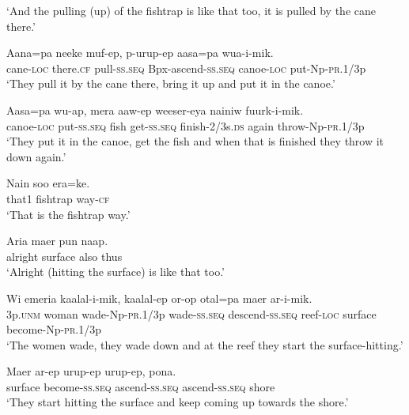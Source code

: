 \glt ‘And the pulling (up) of the fishtrap is like that too, it is pulled by the cane there.’ \\
\z


\ea
\gll  Aana=pa  neeke  muf-ep,  p-urup-ep  aasa=pa  wua-i-mik. \\
cane-\textsc{loc}  there.\textsc{cf}  pull-\textsc{ss.seq}  Bpx-ascend-\textsc{ss.seq}     canoe-\textsc{loc}  put-Np-\textsc{pr}.1/3p \\


\glt ‘They pull it by the cane there, bring it up and put it in the canoe.’ \\
\z


\ea
\gll  Aasa=pa  wu-ap,  mera  aaw-ep  weeser-eya           nainiw  fuurk-i-mik. \\
canoe-\textsc{loc}  put-\textsc{ss.seq}  fish  get-\textsc{ss.seq}  finish-2/3s.\textsc{ds}   again  throw-Np-\textsc{pr}.1/3p \\


\glt ‘They put it in the canoe, get the fish and when that is finished they throw it down again.’ \\
\z


\ea
\gll  Nain  soo  era=ke. \\
that1  fishtrap  way-\textsc{cf} \\
\glt ‘That is the fishtrap way.’ \\
\z


\ea
\gll  Aria  maer  pun  naap. \\
alright  surface  also  thus \\
\glt ‘Alright (hitting the surface) is like that too.’ \\
\z


\ea
\gll  Wi  emeria  kaalal-i-mik,  kaalal-ep     or-op  otal=pa  maer  ar-i-mik. \\
3p.\textsc{unm}  woman  wade{}-Np-\textsc{pr}.1/3p  wade-\textsc{ss.seq}  descend-\textsc{ss.seq}  reef-\textsc{loc}  surface  become-Np-\textsc{pr}.1/3p \\


\glt ‘The women wade, they wade down and at the reef they start the surface-hitting.’ \\
\z


\ea
\gll  Maer  ar-ep  urup-ep  urup-ep,  pona. \\
surface  become-\textsc{ss.seq}  ascend-\textsc{ss.seq}  ascend-\textsc{ss.seq}  shore \\
\glt ‘They start hitting the surface and keep coming up towards the shore.’ \\
\z


